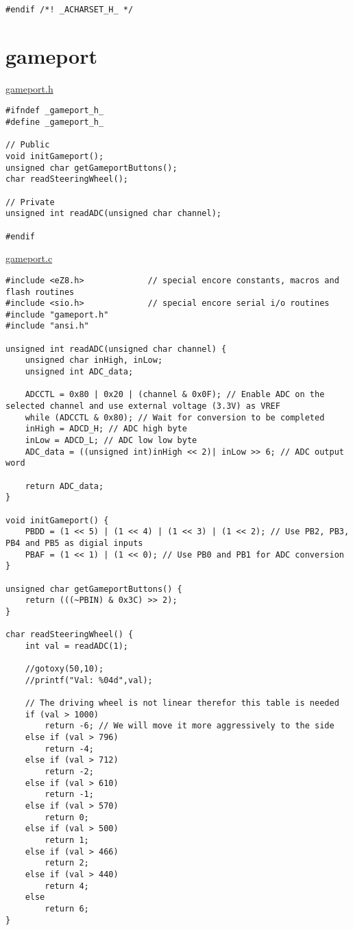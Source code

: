 \begin{lstlisting}
#endif /*! _ACHARSET_H_ */
\end{lstlisting}


\section{gameport}
\label{gameport}

\underline{gameport.h}
\begin{lstlisting}
#ifndef _gameport_h_
#define _gameport_h_

// Public
void initGameport();
unsigned char getGameportButtons();
char readSteeringWheel();

// Private
unsigned int readADC(unsigned char channel);

#endif
\end{lstlisting}

\underline{gameport.c}
\begin{lstlisting}
#include <eZ8.h>             // special encore constants, macros and flash routines
#include <sio.h>             // special encore serial i/o routines
#include "gameport.h"
#include "ansi.h"

unsigned int readADC(unsigned char channel) {
	unsigned char inHigh, inLow;
	unsigned int ADC_data;

	ADCCTL = 0x80 | 0x20 | (channel & 0x0F); // Enable ADC on the selected channel and use external voltage (3.3V) as VREF
	while (ADCCTL & 0x80); // Wait for conversion to be completed
	inHigh = ADCD_H; // ADC high byte
	inLow = ADCD_L; // ADC low low byte
	ADC_data = ((unsigned int)inHigh << 2)| inLow >> 6; // ADC output word

	return ADC_data;
}

void initGameport() {
	PBDD = (1 << 5) | (1 << 4) | (1 << 3) | (1 << 2); // Use PB2, PB3, PB4 and PB5 as digial inputs
	PBAF = (1 << 1) | (1 << 0); // Use PB0 and PB1 for ADC conversion
}

unsigned char getGameportButtons() {
	return (((~PBIN) & 0x3C) >> 2);
}

char readSteeringWheel() {
	int val = readADC(1);

	//gotoxy(50,10);
	//printf("Val: %04d",val);

	// The driving wheel is not linear therefor this table is needed
	if (val > 1000)
		return -6; // We will move it more aggressively to the side
	else if (val > 796)
		return -4;
	else if (val > 712)
		return -2;
	else if (val > 610)
		return -1;
	else if (val > 570)
		return 0;
	else if (val > 500)
		return 1;
	else if (val > 466)
		return 2;
	else if (val > 440)
		return 4;
	else
		return 6;
}
\end{lstlisting}

